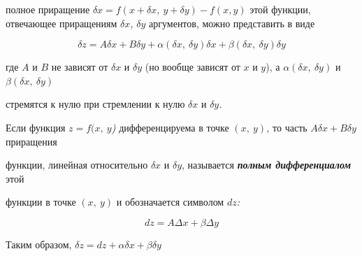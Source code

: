 полное приращение
$\delta x = f(x + \delta x,\ y + \delta y) - f(x,y)$ этой функции,
отвечающее приращениям $\delta x$\emph{,} $\delta y$ аргументов,
можно представить в виде

\[\delta z = A\delta x + B\delta y + \alpha(\delta x,\ \delta y)\delta x + \beta(\delta x,\ \delta y)\delta y\]

где $A$ и $B$ не зависят от $\delta x$ и $\delta y$ (но вообще
зависят от $x$ и $y$), а
$\alpha(\delta x,\ \delta y)$ и $\beta(\delta x,\ \delta y)$

стремятся к нулю при стремлении к нулю
$\delta x$ и $\delta y$\emph{.}

Если функция $z = f(x,\ y$\emph{)} дифференцируема в точке
$(x,\ y)$\emph{,} то часть $A\delta x + B\delta y$ приращения

функции, линейная относительно $\delta x$ и $\delta y$, называется
\emph{\textbf{полным дифференциалом}} этой

функции в точке $(x,\ y)$ и обозначается символом
$dz$\emph{:}

\[dz = A\Delta x + \beta\Delta y\]

Таким образом, $\delta z = dz + \alpha\delta x + \beta\delta y$
